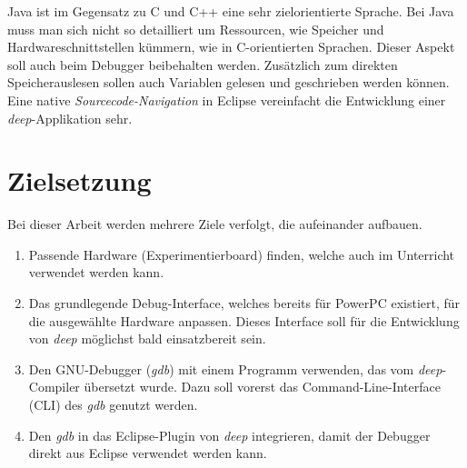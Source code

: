 Java ist im Gegensatz zu C und C++ eine sehr zielorientierte Sprache.
Bei Java muss man sich nicht so detailliert um Ressourcen, wie Speicher und Hardwareschnittstellen kümmern, wie in C-orientierten Sprachen.
Dieser Aspekt soll auch beim Debugger beibehalten werden.
Zusätzlich zum direkten Speicherauslesen sollen auch Variablen gelesen und geschrieben werden können.
Eine native \textit{Sourcecode-Navigation} in Eclipse vereinfacht die Entwicklung einer \textit{deep}-Applikation sehr.



\section{Zielsetzung}
Bei dieser Arbeit werden mehrere Ziele verfolgt, die aufeinander aufbauen.


\begin{enumerate}
\item Passende Hardware (Experimentierboard) finden, welche auch im Unterricht verwendet werden kann.
\item Das grundlegende Debug-Interface, welches bereits für PowerPC existiert, für die ausgewählte Hardware anpassen. Dieses Interface soll für die Entwicklung von \textit{deep} möglichst bald einsatzbereit sein.
\item Den GNU-Debugger (\textit{gdb}) mit einem Programm verwenden, das vom \textit{deep}-Compiler übersetzt wurde. Dazu soll vorerst das Command-Line-Interface (CLI) des \textit{gdb} genutzt werden.
\item Den \textit{gdb} in das Eclipse-Plugin von \textit{deep} integrieren, damit der Debugger direkt aus Eclipse verwendet werden kann.
\end{enumerate}









